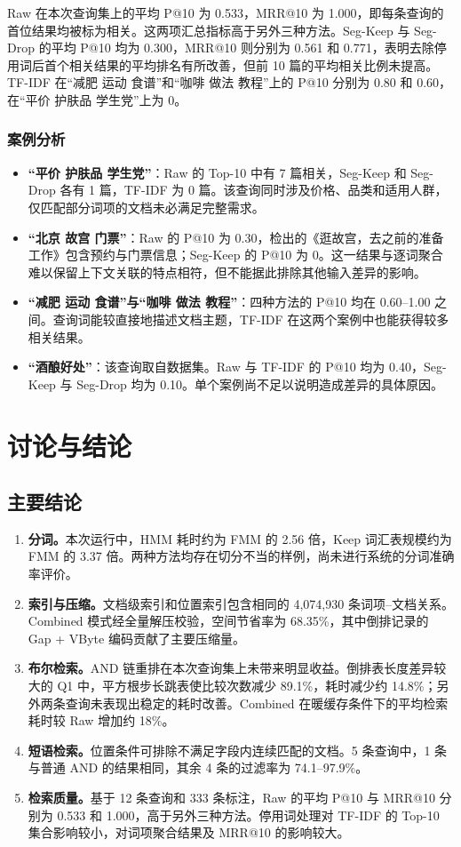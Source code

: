 \documentclass[UTF8,a4paper,11pt,fontset=fandol]{ctexart}
\begin{document}
Raw 在本次查询集上的平均 P@10 为 0.533，MRR@10 为 1.000，即每条查询的首位结果均被标为相关。这两项汇总指标高于另外三种方法。Seg-Keep 与 Seg-Drop 的平均 P@10 均为 0.300，MRR@10 则分别为 0.561 和 0.771，表明去除停用词后首个相关结果的平均排名有所改善，但前 10 篇的平均相关比例未提高。TF-IDF 在“减肥 运动 食谱”和“咖啡 做法 教程”上的 P@10 分别为 0.80 和 0.60，在“平价 护肤品 学生党”上为 0。


\subsubsection{案例分析}
\begin{itemize}
  \item \textbf{“平价 护肤品 学生党”}：Raw 的 Top-10 中有 7 篇相关，Seg-Keep 和 Seg-Drop 各有 1 篇，TF-IDF 为 0 篇。该查询同时涉及价格、品类和适用人群，仅匹配部分词项的文档未必满足完整需求。
  \item \textbf{“北京 故宫 门票”}：Raw 的 P@10 为 0.30，检出的《逛故宫，去之前的准备工作》包含预约与门票信息；Seg-Keep 的 P@10 为 0。这一结果与逐词聚合难以保留上下文关联的特点相符，但不能据此排除其他输入差异的影响。
  \item \textbf{“减肥 运动 食谱”与“咖啡 做法 教程”}：四种方法的 P@10 均在 0.60--1.00 之间。查询词能较直接地描述文档主题，TF-IDF 在这两个案例中也能获得较多相关结果。
  \item \textbf{“酒酿好处”}：该查询取自数据集。Raw 与 TF-IDF 的 P@10 均为 0.40，Seg-Keep 与 Seg-Drop 均为 0.10。单个案例尚不足以说明造成差异的具体原因。
\end{itemize}

\section{讨论与结论}
\subsection{主要结论}
\begin{enumerate}
  \item \textbf{分词。}本次运行中，HMM 耗时约为 FMM 的 2.56 倍，Keep 词汇表规模约为 FMM 的 3.37 倍。两种方法均存在切分不当的样例，尚未进行系统的分词准确率评价。
  \item \textbf{索引与压缩。}文档级索引和位置索引包含相同的 4,074,930 条词项--文档关系。Combined 模式经全量解压校验，空间节省率为 68.35\%，其中倒排记录的 Gap + VByte 编码贡献了主要压缩量。
  \item \textbf{布尔检索。}AND 链重排在本次查询集上未带来明显收益。倒排表长度差异较大的 Q1 中，平方根步长跳表使比较次数减少 89.1\%，耗时减少约 14.8\%；另外两条查询未表现出稳定的耗时改善。Combined 在暖缓存条件下的平均检索耗时较 Raw 增加约 18\%。
  \item \textbf{短语检索。}位置条件可排除不满足字段内连续匹配的文档。5 条查询中，1 条与普通 AND 的结果相同，其余 4 条的过滤率为 74.1--97.9\%。
  \item \textbf{检索质量。}基于 12 条查询和 333 条标注，Raw 的平均 P@10 与 MRR@10 分别为 0.533 和 1.000，高于另外三种方法。停用词处理对 TF-IDF 的 Top-10 集合影响较小，对词项聚合结果及 MRR@10 的影响较大。
\end{enumerate}
\end{document}
